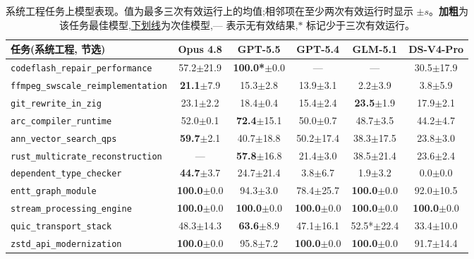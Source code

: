 \begin{table}[h]
\centering
\footnotesize
\setlength{\tabcolsep}{2pt}
\begin{tabular}{l ccccc}
\toprule
\textbf{任务(系统工程, 节选)} & \textbf{Opus 4.8} & \textbf{GPT-5.5} & \textbf{GPT-5.4} & \textbf{GLM-5.1} & \textbf{DS-V4-Pro} \\
\midrule
\texttt{codeflash\_repair\_performance} & 57.2$\pm$21.9 & \textbf{100.0*}$\pm$0.0 & --- & --- & 30.5$\pm$17.9 \\
\texttt{ffmpeg\_swscale\_reimplementation} & \textbf{21.1}$\pm$7.9 & 15.3$\pm$2.8 & 13.9$\pm$3.1 & 2.2$\pm$3.9 & 3.8$\pm$5.9 \\
\texttt{git\_rewrite\_in\_zig} & 23.1$\pm$2.2 & 18.4$\pm$0.4 & 15.4$\pm$2.4 & \textbf{23.5}$\pm$1.9 & 17.9$\pm$2.1 \\
\texttt{arc\_compiler\_runtime} & 52.0$\pm$0.1 & \textbf{72.4}$\pm$15.1 & 50.0$\pm$0.7 & 48.7$\pm$3.5 & 44.2$\pm$4.7 \\
\texttt{ann\_vector\_search\_qps} & \textbf{59.7}$\pm$2.1 & 40.7$\pm$18.8 & 50.2$\pm$17.4 & 38.3$\pm$17.5 & 23.8$\pm$3.0 \\
\texttt{rust\_multicrate\_reconstruction} & --- & \textbf{57.8}$\pm$16.8 & 21.4$\pm$3.0 & 38.5$\pm$21.4 & 23.6$\pm$2.4 \\
\texttt{dependent\_type\_checker} & \textbf{44.7}$\pm$3.7 & 24.7$\pm$21.4 & 3.8$\pm$6.7 & 1.9$\pm$3.2 & 0.0$\pm$0.0 \\
\texttt{entt\_graph\_module} & \textbf{100.0}$\pm$0.0 & 94.3$\pm$3.0 & 78.4$\pm$25.7 & \textbf{100.0}$\pm$0.0 & 92.0$\pm$10.5 \\
\texttt{stream\_processing\_engine} & \textbf{100.0}$\pm$0.0 & \textbf{100.0}$\pm$0.0 & \textbf{100.0}$\pm$0.0 & \textbf{100.0}$\pm$0.0 & \textbf{100.0}$\pm$0.0 \\
\texttt{quic\_transport\_stack} & 48.3$\pm$14.3 & \textbf{63.6}$\pm$8.9 & 47.1$\pm$16.1 & 52.5*$\pm$22.4 & 33.4$\pm$10.0 \\
\texttt{zstd\_api\_modernization} & \textbf{100.0}$\pm$0.0 & 95.8$\pm$7.2 & \textbf{100.0}$\pm$0.0 & \textbf{100.0}$\pm$0.0 & 91.7$\pm$14.4 \\
\bottomrule
\end{tabular}
\caption{系统工程任务上模型表现。值为最多三次有效运行上的均值;相邻项在至少两次有效运行时显示 $\pm s$。\textbf{加粗}为该任务最佳模型,\underline{下划线}为次佳模型,--- 表示无有效结果,$\ast$ 标记少于三次有效运行。}
\label{tab:scores-sse}
\end{table}

